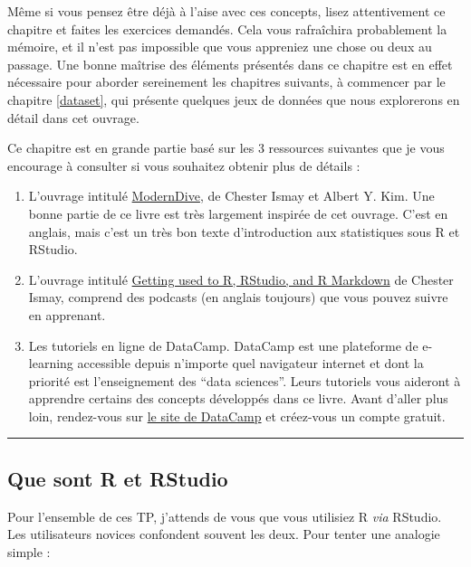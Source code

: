 \documentclass[a4paperpaper,]{article}
\providecommand{\tightlist}{%
  \setlength{\itemsep}{0pt}\setlength{\parskip}{0pt}}
\begin{document}
Même si vous pensez être déjà à l'aise avec ces concepts, lisez attentivement ce chapitre et faites les exercices demandés. Cela vous rafraîchira probablement la mémoire, et il n'est pas impossible que vous appreniez une chose ou deux au passage. Une bonne maîtrise des éléments présentés dans ce chapitre est en effet nécessaire pour aborder sereinement les chapitres suivants, à commencer par le chapitre \ref{dataset}, qui présente quelques jeux de données que nous explorerons en détail dans cet ouvrage.

Ce chapitre est en grande partie basé sur les 3 ressources suivantes que je vous encourage à consulter si vous souhaitez obtenir plus de détails :

\begin{enumerate}
\def\labelenumi{\arabic{enumi}.}
\tightlist
\item
  L'ouvrage intitulé \href{https://moderndive.com/index.html}{ModernDive}, de Chester Ismay et Albert Y. Kim. Une bonne partie de ce livre est très largement inspirée de cet ouvrage. C'est en anglais, mais c'est un très bon texte d'introduction aux statistiques sous R et RStudio.
\item
  L'ouvrage intitulé \href{https://ismayc.github.io/rbasics-book/}{Getting used to R, RStudio, and R Markdown} de Chester Ismay, comprend des podcasts (en anglais toujours) que vous pouvez suivre en apprenant.
\item
  Les tutoriels en ligne de DataCamp. DataCamp est une plateforme de e-learning accessible depuis n'importe quel navigateur internet et dont la priorité est l'enseignement des ``data sciences''. Leurs tutoriels vous aideront à apprendre certains des concepts développés dans ce livre. Avant d'aller plus loin, rendez-vous sur \href{https://www.datacamp.com/}{le site de DataCamp} et créez-vous un compte gratuit.
\end{enumerate}

\begin{center}\rule{0.5\linewidth}{\linethickness}\end{center}

\hypertarget{que-sont-r-et-rstudio}{%
\subsection{Que sont R et RStudio}\label{que-sont-r-et-rstudio}}

Pour l'ensemble de ces TP, j'attends de vous que vous utilisiez R \emph{via} RStudio. Les utilisateurs novices confondent souvent les deux. Pour tenter une analogie simple :
\end{document}
